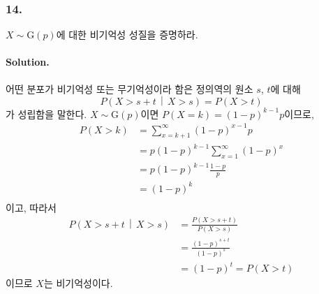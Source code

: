 \subsubsection{14.} $X\sim \mathrm{G}\left(p\right)$에 대한 비기억성 성질을 증명하라.

\paragraph{Solution.} 어떤 분포가 비기억성 또는 무기억성이라 함은 정의역의 원소 $s$, $t$에 대해
\[P\left(X > s+t\,\middle|\,X > s\right) = P\left(X > t\right)\]
가 성립함을 말한다. $X\sim \mathrm{G}\left(p\right)$이면 $P\left(X=k\right)=\left(1-p\right)^{k-1}p$이므로,
\begin{align*}
    P\left(X > k\right) &= \sum_{x=k + 1}^{\infty} \left(1-p\right)^{x-1}p \\
    &= p\left(1-p\right)^{k-1} \sum_{x=1}^{\infty} \left(1-p\right)^{x} \\
    &= p\left(1-p\right)^{k-1} \frac{1-p}{p} \\
    &= \left(1-p\right)^{k} \\
\end{align*}
이고, 따라서
\begin{align*}
    P\left(X > s+t\,\middle|\,X > s\right) &= \frac{P\left(X > s+t\right)}{P\left(X > s\right)} \\
    &= \frac{\left(1-p\right)^{s+t}}{\left(1-p\right)^{s}} \\
    &= \left(1-p\right)^{t} = P\left(X > t\right)
\end{align*}
이므로 $X$는 비기억성이다.